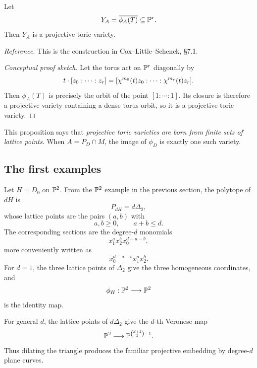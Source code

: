\begin{proposition}
\label{prop:projective-toric-variety-from-lattice-points}
Let
\[
Y_A=\overline{\phi_A(T)}\subseteq \mathbb{P}^r.
\]
Then \(Y_A\) is a projective toric variety.
\end{proposition}

\noindent
\textit{Reference.}
This is the construction in Cox--Little--Schenck, \S7.1.

\begin{proof}[Conceptual proof sketch]
Let the torus act on \(\mathbb{P}^r\) diagonally by
\[
t\cdot[z_0:\cdots:z_r]
=
[\chi^{m_0}(t)z_0:\cdots:\chi^{m_r}(t)z_r].
\]
Then \(\phi_A(T)\) is precisely the orbit of the point
\([
1:\cdots:1
]\).
Its closure is therefore a projective variety containing a dense torus
orbit, so it is a projective toric variety.
\end{proof}

This proposition says that \emph{projective toric varieties are born
from finite sets of lattice points}. When \(A=P_D\cap M\), the image
of \(\phi_D\) is exactly one such variety.

\subsection{The first examples}

\begin{example}
Let \(H=D_0\) on \(\mathbb{P}^2\). From the \(\mathbb{P}^2\) example in the previous section, the polytope of \(dH\) is
\[
P_{dH}=d\Delta_2,
\]
whose lattice points are the pairs \((a,b)\) with
\[
a,b\geq 0,
\qquad
a+b\leq d.
\]
The corresponding sections are the degree-\(d\) monomials
\[
x_1^ax_2^bx_0^{d-a-b},
\]
more conveniently written as
\[
x_0^{d-a-b}x_1^ax_2^b.
\]
For \(d=1\), the three lattice points of \(\Delta_2\) give the three
homogeneous coordinates, and
\[
\phi_H:\mathbb{P}^2\longrightarrow \mathbb{P}^2
\]
is the identity map.

For general \(d\), the lattice points of \(d\Delta_2\) give the
\(d\)-th Veronese map
\[
\mathbb{P}^2\longrightarrow \mathbb{P}^{\binom{d+2}{2}-1}.
\]
Thus dilating the triangle produces the familiar projective embedding
by degree-\(d\) plane curves.
\end{example}

